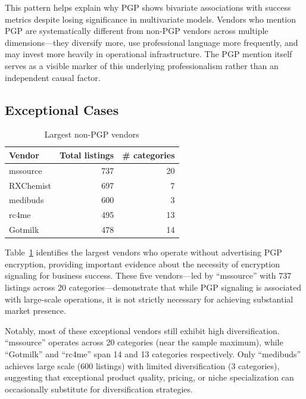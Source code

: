 \documentclass{article}
\begin{document}
This pattern helps explain why PGP shows bivariate associations with success metrics despite losing significance in multivariate models. Vendors who mention PGP are systematically different from non-PGP vendors across multiple dimensions—they diversify more, use professional language more frequently, and may invest more heavily in operational infrastructure. The PGP mention itself serves as a visible marker of this underlying professionalism rather than an independent causal factor.

\subsection{Exceptional Cases}

\begin{table}[htbp]
  \centering
  \scriptsize
  \caption{Largest non-PGP vendors}
  \label{tab:nonpgp_outliers}
  \begin{tabular}{lrr}
    \toprule
    Vendor & Total listings & \# categories\\
    \midrule
    mssource   & 737 & 20\\
    RXChemist  & 697 &  7\\
    medibuds   & 600 &  3\\
    rc4me      & 495 & 13\\
    Gotmilk    & 478 & 14\\
    \bottomrule
  \end{tabular}
\end{table}

Table~\ref{tab:nonpgp_outliers} identifies the largest vendors who operate without advertising PGP encryption, providing important evidence about the necessity of encryption signaling for business success. These five vendors—led by ``mssource'' with 737 listings across 20 categories—demonstrate that while PGP signaling is associated with large-scale operations, it is not strictly necessary for achieving substantial market presence.

Notably, most of these exceptional vendors still exhibit high diversification. ``mssource'' operates across 20 categories (near the sample maximum), while ``Gotmilk'' and ``rc4me'' span 14 and 13 categories respectively. Only ``medibuds'' achieves large scale (600 listings) with limited diversification (3 categories), suggesting that exceptional product quality, pricing, or niche specialization can occasionally substitute for diversification strategies.
\end{document}
